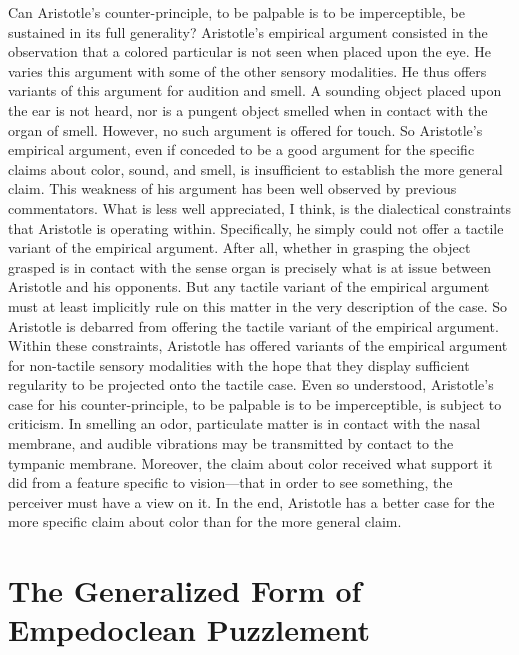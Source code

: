 Can Aristotle's counter-principle, to be palpable is to be imperceptible, be sustained in its full generality? Aristotle's empirical argument consisted in the observation that a colored particular is not seen when placed upon the eye. He varies this argument with some of the other sensory modalities. He thus offers variants of this argument for audition and smell. A sounding object placed upon the ear is not heard, nor is a pungent object smelled when in contact with the organ of smell. However, no such argument is offered for touch. So Aristotle's empirical argument, even if conceded to be a good argument for the specific claims about color, sound, and smell, is insufficient to establish the more general claim. This weakness of his argument has been well observed by previous commentators. What is less well appreciated, I think, is the dialectical constraints that Aristotle is operating within. Specifically, he simply could not offer a tactile variant of the empirical argument. After all, whether in grasping the object grasped is in contact with the sense organ is precisely what is at issue between Aristotle and his opponents. But any tactile variant of the empirical  argument must at least implicitly rule on this matter in the very description of the case. So Aristotle is debarred from offering the tactile variant of the empirical argument. Within these constraints, Aristotle has offered variants of the empirical argument for non-tactile sensory modalities with the hope that they display sufficient regularity to be projected onto the tactile case. Even so understood, Aristotle's case for his counter-principle, to be palpable is to be imperceptible, is subject to criticism. In smelling an odor, particulate matter is in contact with the nasal membrane, and audible vibrations may be transmitted by contact to the tympanic membrane. Moreover, the claim about color received what support it did from a feature specific to vision---that in order to see something, the perceiver must have a view on it. In the end, Aristotle has a better case for the more specific claim about color than for the more general claim.


\section{The Generalized Form of Empedoclean Puzzlement} %
\label{sec:the_generalized_form_of_empedoclean_puzzlement}


